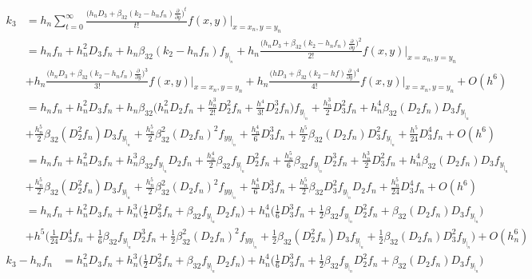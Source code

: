 \documentclass[12 pt]{article}
\begin{document}
	{
		\normalsize
		\begin{equation}
			\begin{split}
				k_{3} &= h_{n}\sum_{t=0}^{\infty}\frac{\bigg(h_{n}D_{3}+\beta_{32}(k_{2}-h_{n}f_{n})\frac{\partial}{\partial y}\bigg)^{t}}{t!}f(x,y)\bigg\vert_{x = x_{n}, y= y_{n}}\\
				&= h_{n}f_{n} + h_{n}^{2}D_{3}f_{n} + h_{n}\beta_{32}(k_{2}-h_{n}f_{n})f_{y_{|_{n}}} + h_{n}\frac{\bigg(h_{n}D_{3}+\beta_{32}(k_{2}-h_{n}f_{n})\frac{\partial}{\partial y}\bigg)^{2}}{2!}f(x,y)\bigg\vert_{x = x_{n}, y= y_{n}} \\
				&+ h_{n}\frac{\bigg(h_{n}D_{3}+\beta_{32}(k_{2}-h_{n}f_{n})\frac{\partial}{\partial y}\bigg)^{3}}{3!}f(x,y)\bigg\vert_{x = x_{n}, y= y_{n}}  +h_{n}\frac{\bigg(hD_{3}+\beta_{32}(k_{2}-hf)\frac{\partial}{\partial y}\bigg)^{4}}{4!}f(x,y)\bigg\vert_{x = x_{n}, y= y_{n}} + O(h^{6}) \\
				&= h_{n}f_{n} + h_{n}^{2}D_{3}f_{n} + h_{n}\beta_{32}\bigg( h_{n}^{2}D_{2}f_{n} + \frac{h_{n}^{3}}{2!}D_{2}^{2}f_{n} + \frac{h^{4}}{3!}D_{2}^{3}f_{n}\bigg)f_{y_{|_{n}}} + \frac{h_{n}^{3}}{2}D_{3}^{2}f_{n} + h_{n}^{4}\beta_{32}(D_{2}f_{n})D_{3}f_{y_{|_{n}}} \\
				&+ \frac{h_{n}^{5}}{2}\beta_{32}(D_{2}^{2}f_{n})D_{3}f_{y_{|_{n}}} + \frac{h_{n}^{5}}{2}\beta_{32}^{2}(D_{2}f_{n})^{2}f_{yy_{|_{n}}} + \frac{h_{n}^{4}}{6}D_{3}^{3}f_{n} + \frac{h^{5}}{2}\beta_{32}(D_{2}f_{n})D_{3}^{2}f_{y_{|_{n}}} + \frac{h^{5}}{24}D_{3}^{4}f_{n} + O(h^{6})\\
				&= h_{n}f_{n} + h_{n}^{2}D_{3}f_{n} + h_{n}^{3}\beta_{32}f_{y_{|_{n}}}D_{2}f_{n} + \frac{h_{n}^{4}}{2}\beta_{32}f_{y_{|_{n}}}D_{2}^{2}f_{n} + \frac{h_{n}^{5}}{6}\beta_{32}f_{y_{|_{n}}}D_{2}^{3}f_{n} + \frac{h_{n}^{3}}{2}D_{3}^{2}f_{n} + h_{n}^{4}\beta_{32}(D_{2}f_{n})D_{3}f_{y_{|_{n}}}\\
				&+ \frac{h_{n}^{5}}{2}\beta_{32}(D_{2}^{2}f_{n})D_{3}f_{y_{|_{n}}} + \frac{h_{n}^{5}}{2}\beta_{32}^{2}(D_{2}f_{n})^{2}f_{yy_{|_{n}}} + \frac{h_{n}^{4}}{6}D_{3}^{3}f_{n} + \frac{h_{n}^{5}}{2}\beta_{32}D_{3}^{2}f_{y_{|_{n}}}D_{2}f_{n} + \frac{h_{n}^{5}}{24}D_{3}^{4}f_{n} + O(h^{6})\\
				&= h_{n}f_{n} + h_{n}^{2}D_{3}f_{n} + h_{n}^{3}\bigg(\frac{1}{2}D_{3}^{2}f_{n} + \beta_{32}f_{y_{|_{n}}}D_{2}f_{n}\bigg) + h_{n}^{4}\bigg(\frac{1}{6}D_{3}^{3}f_{n} + \frac{1}{2}\beta_{32}f_{y_{|_{n}}}D_{2}^{2}f_{n} + \beta_{32}(D_{2}f_{n})D_{3}f_{y_{|_{n}}}\bigg) \\
				&+ h^{5}\bigg(\frac{1}{24}D^{4}_{3}f_{n} + \frac{1}{6}\beta_{32}f_{y_{|_{n}}}D_{2}^{3}f_{n} + \frac{1}{2}\beta_{32}^{2}(D_{2}f_{n})^{2}f_{yy_{|_{n}}} + \frac{1}{2}\beta_{32}(D_{2}^{2}f_{n})D_{3}f_{y_{|_{n}}} + \frac{1}{2}\beta_{32}(D_{2}f_{n})D_{3}^{2}f_{y_{|_{n}}}\bigg) + O(h_{n}^{6})
			\end{split}
		\end{equation}
	}
	\normalsize
	\begin{align*}
		k_{3} - h_{n}f_{n} &= h_{n}^{2}D_{3}f_{n} + h_{n}^{3}\bigg(\frac{1}{2}D_{3}^{2}f_{n} + \beta_{32}f_{y_{|_{n}}}D_{2}f_{n}\bigg) + h_{n}^{4}\bigg(\frac{1}{6}D_{3}^{3}f_{n} + \frac{1}{2}\beta_{32}f_{y_{|_{n}}}D_{2}^{2}f_{n} + \beta_{32}(D_{2}f_{n})D_{3}f_{y_{|_{n}}}\bigg)
	\end{align*}
	
\end{document}
